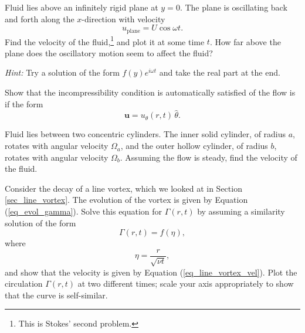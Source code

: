 \begin{problem}
\label{prob_cyl_osc}
Fluid lies above an infinitely rigid plane at $y=0$.  The plane is oscillating back and forth along the $x$-direction with velocity
\[
u_\text{plane} = U \cos \omega t.
\]
Find the velocity of the fluid,\footnote{This is Stokes' second problem.} and plot it at some time $t$.  How far above the plane does the oscillatory motion seem to affect the fluid?

\emph{Hint:}  Try a solution of the form $f(y) e^{i \omega t}$ and take the real part at the end.
\end{problem}

\begin{problem}
\label{prob_cyl_incomp}
Show that the incompressibility condition is automatically satisfied of the flow is if the form 
\[
\mathbf{u} = u_\theta (r, t) \, \hat{\theta}.
\]
\end{problem}

\begin{problem}
\label{prob_cyl_two}
Fluid lies between two concentric cylinders.  The inner solid cylinder, of radius $a$, rotates with angular velocity $\Omega_a$, and the outer hollow cylinder, of radius $b$, rotates with angular velocity $\Omega_b$.  Assuming the flow is steady, find the velocity of the fluid.
\end{problem}

\begin{problem}
\label{prob_sim}
Consider the decay of a line vortex, which we looked at in Section \ref{sec_line_vortex}.  The evolution of the vortex is given by Equation (\ref{eq_evol_gamma}).  Solve this equation for $\Gamma(r, t)$ by assuming a similarity solution of the form
\[
\Gamma(r, t) = f(\eta),
\]
where 
\[
\eta = \frac{r}{\sqrt{\nu t}},
\]
and show that the velocity is given by Equation (\ref{eq_line_vortex_vel}).  Plot the circulation $\Gamma(r, t)$ at two different times; scale your axis appropriately to show that the curve is self-similar.
\end{problem}


